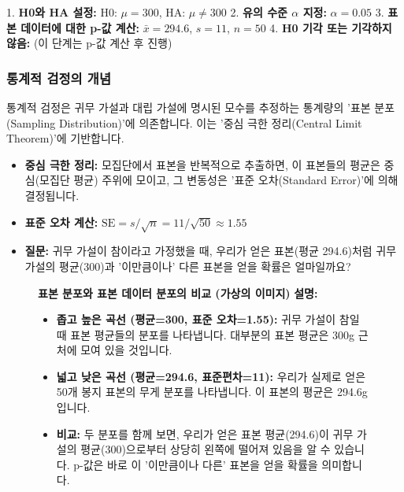 \documentclass[11pt,a4paper]{book}
\providecommand{\captionof}[2]{\textbf{#2}}
\theoremstyle{definition}
\begin{document}
1.  \textbf{H0와 HA 설정:} H0: $\mu = 300$, HA: $\mu \ne 300$
2.  \textbf{유의 수준 $\alpha$ 지정:} $\alpha = 0.05$
3.  \textbf{표본 데이터에 대한 p-값 계산:} $\bar{x} = 294.6$, $s = 11$, $n = 50$
4.  \textbf{H0 기각 또는 기각하지 않음:} (이 단계는 p-값 계산 후 진행)

\subsubsection*{통계적 검정의 개념}

통계적 검정은 귀무 가설과 대립 가설에 명시된 모수를 추정하는 통계량의 '표본 분포(Sampling Distribution)'에 의존합니다. 이는 '중심 극한 정리(Central Limit Theorem)'에 기반합니다.

\begin{itemize}
    \item \textbf{중심 극한 정리:} 모집단에서 표본을 반복적으로 추출하면, 이 표본들의 평균은 중심(모집단 평균) 주위에 모이고, 그 변동성은 '표준 오차(Standard Error)'에 의해 결정됩니다.
    \item \textbf{표준 오차 계산:} $\text{SE} = s / \sqrt{n} = 11 / \sqrt{50} \approx 1.55$
    \item \textbf{질문:} 귀무 가설이 참이라고 가정했을 때, 우리가 얻은 표본(평균 294.6)처럼 귀무 가설의 평균(300)과 '이만큼이나' 다른 표본을 얻을 확률은 얼마일까요?
\end{itemize}

\begin{figure}[h!]
    \centering
    \captionof{figure}{표본 분포와 표본 데이터 분포의 비교 (가상의 이미지)}
    \label{fig:sampling_distribution}
    \vspace{0.5em}
    \textbf{설명:}
    \begin{itemize}
        \item \textbf{좁고 높은 곡선 (평균=300, 표준 오차=1.55):} 귀무 가설이 참일 때 표본 평균들의 분포를 나타냅니다. 대부분의 표본 평균은 300g 근처에 모여 있을 것입니다.
        \item \textbf{넓고 낮은 곡선 (평균=294.6, 표준편차=11):} 우리가 실제로 얻은 50개 봉지 표본의 무게 분포를 나타냅니다. 이 표본의 평균은 294.6g입니다.
        \item \textbf{비교:} 두 분포를 함께 보면, 우리가 얻은 표본 평균(294.6)이 귀무 가설의 평균(300)으로부터 상당히 왼쪽에 떨어져 있음을 알 수 있습니다. p-값은 바로 이 '이만큼이나 다른' 표본을 얻을 확률을 의미합니다.
    \end{itemize}
\end{figure}
\end{document}
